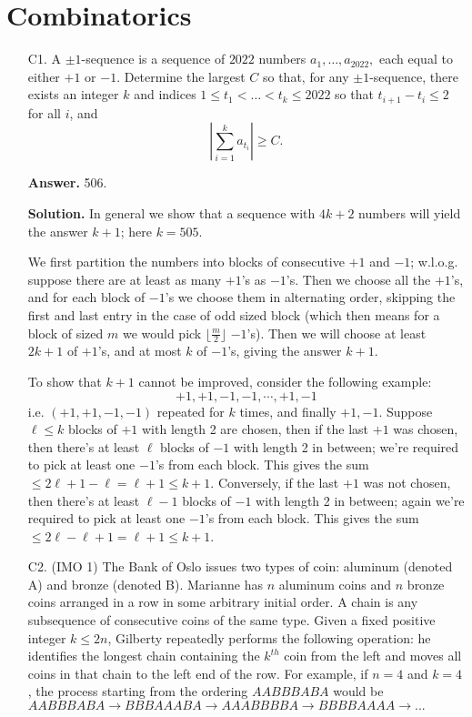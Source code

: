\documentclass[11pt,a4paper]{article}
\begin{document}
    \section*{Combinatorics}
    \begin{enumerate}
    	\item [C1.]
    	A $\pm 1$-sequence is a sequence of $2022$ numbers $a_1, \ldots, a_{2022},$ each equal to either $+1$ or $-1$. Determine the largest $C$ so that, for any $\pm 1$-sequence, there exists an integer $k$ and indices $1 \le t_1 < \ldots < t_k \le 2022$ so that $t_{i+1} - t_i \le 2$ for all $i$, and$$\left| \sum_{i=1}^{k} a_{t_i} \right| \ge C.$$
    	
    	\textbf{Answer.} 506. 
    	
    	\textbf{Solution.} 
    	In general we show that a sequence with $4k+2$ numbers will yield the answer $k + 1$; here $k=505$. 
    	
    	We first partition the numbers into blocks of consecutive $+1$ and $-1$; 
    	w.l.o.g. suppose there are at least as many $+1$'s as $-1$'s. Then we choose all the $+1$'s, 
    	and for each block of $-1$'s we choose them in alternating order, skipping the first and last entry in the case of odd sized block 
    	(which then means for a block of sized $m$ we would pick $\lfloor \frac{m}{2}\rfloor$ $-1$'s). 
    	Then we will choose at least $2k+1$ of $+1$'s, and at most $k$ of $-1$'s, giving the answer $k + 1$. 
    	
    	To show that $k+1$ cannot be improved, consider the following example: 
    	\[
    	+1, +1, -1, -1, \cdots, +1, -1
    	\]
    	i.e. $(+1, +1, -1, -1)$ repeated for $k$ times, and finally $+1, -1$. Suppose $\ell\le k$ blocks of  $+1$ with length 2 are chosen, then if the last $+1$ was chosen, then there's at least $\ell$ blocks of $-1$ with length 2 in between; we're required to pick at least one $-1$'s from each block. 
    	This gives the sum $\le 2\ell+1-\ell=\ell+1\le k+1$. 
    	Conversely, if the last $+1$ was not chosen, then there's at least $\ell - 1$ blocks of $-1$ with length 2 in between; again we're required to pick at least one $-1$'s from each block. 
    	This gives the sum $\le 2\ell-\ell + 1=\ell+1\le k+1$. 
    	
    	\item[C2.] (IMO 1)
    	The Bank of Oslo issues two types of coin: aluminum (denoted A) and bronze (denoted B). Marianne has $n$ aluminum coins and $n$ bronze coins arranged in a row in some arbitrary initial order. A chain is any subsequence of consecutive coins of the same type. Given a fixed positive integer $k \leq 2n$, Gilberty repeatedly performs the following operation: he identifies the longest chain containing the $k^{th}$ coin from the left and moves all coins in that chain to the left end of the row. For example, if $n=4$ and $k=4$, the process starting from the ordering $AABBBABA$ would be $AABBBABA \to BBBAAABA \to AAABBBBA \to BBBBAAAA \to ...$
    	

\end{enumerate}
\end{document}
